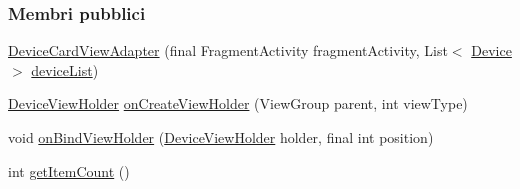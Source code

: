 \subsubsection*{Membri pubblici}
\begin{DoxyCompactItemize}
\item 
\hyperlink{classit_1_1unibo_1_1torsello_1_1bluetoothpositioning_1_1adapter_1_1DeviceCardViewAdapter_a5f15271cd20868ac66c3c0876adca536_a5f15271cd20868ac66c3c0876adca536}{Device\+Card\+View\+Adapter} (final Fragment\+Activity fragment\+Activity, List$<$ \hyperlink{classit_1_1unibo_1_1torsello_1_1bluetoothpositioning_1_1model_1_1Device}{Device} $>$ \hyperlink{classit_1_1unibo_1_1torsello_1_1bluetoothpositioning_1_1adapter_1_1DeviceCardViewAdapter_a72413f87c723c585bd1ad9bc5711cf39_a72413f87c723c585bd1ad9bc5711cf39}{device\+List})
\item 
\hyperlink{classit_1_1unibo_1_1torsello_1_1bluetoothpositioning_1_1adapter_1_1DeviceCardViewAdapter_1_1DeviceViewHolder}{Device\+View\+Holder} \hyperlink{classit_1_1unibo_1_1torsello_1_1bluetoothpositioning_1_1adapter_1_1DeviceCardViewAdapter_a41227667123e30333d534b562a889229_a41227667123e30333d534b562a889229}{on\+Create\+View\+Holder} (View\+Group parent, int view\+Type)
\item 
void \hyperlink{classit_1_1unibo_1_1torsello_1_1bluetoothpositioning_1_1adapter_1_1DeviceCardViewAdapter_a3785bbe8696e1af4d8fb24e7058aa413_a3785bbe8696e1af4d8fb24e7058aa413}{on\+Bind\+View\+Holder} (\hyperlink{classit_1_1unibo_1_1torsello_1_1bluetoothpositioning_1_1adapter_1_1DeviceCardViewAdapter_1_1DeviceViewHolder}{Device\+View\+Holder} holder, final int position)
\item 
int \hyperlink{classit_1_1unibo_1_1torsello_1_1bluetoothpositioning_1_1adapter_1_1DeviceCardViewAdapter_ac039d50f397db6d5af06ca534e3e59a9_ac039d50f397db6d5af06ca534e3e59a9}{get\+Item\+Count} ()
\end{DoxyCompactItemize}

